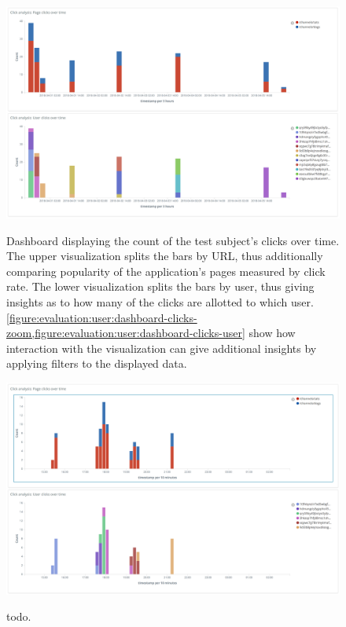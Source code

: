 \begin{figure}[htb]
        \caption{
        Dashboard displaying the count of the test subject's clicks over time.
        The upper visualization splits the bars by URL, thus additionally comparing popularity of the application's pages measured by click rate.
        The lower visualization splits the bars by user, thus giving insights as to how many of the clicks are allotted to which user.
        \cref{figure:evaluation:user:dashboard-clicks-zoom,figure:evaluation:user:dashboard-clicks-user} show how interaction with the visualization can give additional insights by applying filters to the displayed data.
        }
        \includegraphics[width=1.1\textwidth]{gfx/dashboard-clicks.png}
        \label{figure:evaluation:user:dashboard-clicks}
\end{figure}

\begin{figure}[htb]
        \caption{todo.}
        \includegraphics[width=1.1\textwidth]{gfx/dashboard-clicks-zoom.png}
        \label{figure:evaluation:user:dashboard-clicks-zoom}
\end{figure}

